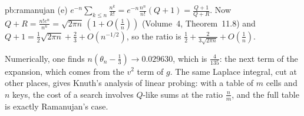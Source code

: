 \begin{solution}{pb:ramanujan}
(e) $e^{-n}\sum_{k\le n}\frac{n^k}{k!}=e^{-n}\frac{n^n}{n!}(Q+1)=\frac{Q+1}{Q+R}$. Now $Q+R=\frac{n!e^n}{n^n}=\sqrt{2\pi n}\,(1+O(\frac1n))$ (Volume~4, Theorem~11.8) and $Q+1=\frac12\sqrt{2\pi n}+\frac23+O(n^{-1/2})$, so the ratio is
$\frac12+\frac2{3\sqrt{2\pi n}}+O(\frac1n)$.

\leads Numerically, one finds $n(\theta_n-\frac13)\to0.029630$, which is $\frac4{135}$: the next term of the expansion, which comes from the $v^2$ term of $g$. The same Laplace
integral, cut at other places, gives Knuth's analysis of linear probing: with a table of $m$ cells and $n$ keys, the cost of a search involves $Q$-like
sums at the ratio $\frac nm$, and the full table is exactly Ramanujan's case.
\end{solution}

